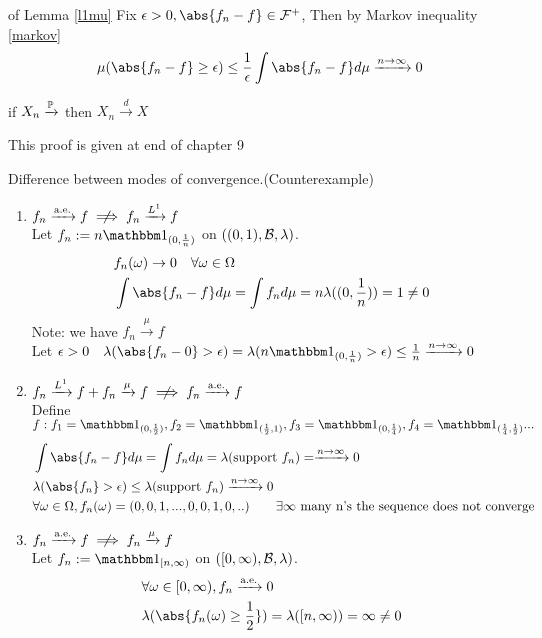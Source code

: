 \pf of Lemma \ref{l1mu} Fix $\epsilon >0, \abs{f_n - f}\in \F^+$, Then by Markov inequality \ref{markov}
\begin{equation*}
    \mu(\abs{f_n-f} \geq \epsilon) \leq \frac{1}{\epsilon}\int \abs{f_n-f} d\mu \xrightarrow{n\rightarrow \infty} 0
\end{equation*}
\begin{lem}
if $X_n \xrightarrow{\mathbb{P}}$ then $X_n \xrightarrow{d} X$
\end{lem}
This proof is given at end of chapter 9
\newpage
\begin{example}Difference between modes of convergence.(Counterexample)
\begin{enumerate}
    \item $f_n \xrightarrow{\text{a.e.}}f \notimplies f_n \xrightarrow{\ls{1}}f$ \\
    Let $f_n := n \I_{(0,\frac{1}{n})}$ on $((0,1),\mathcal{B}, \lambda)$.
    \begin{align*}
        &f_n(\omega) \rightarrow 0 \quad \forall \omega \in \Omega \\
        &\int \abs{f_n - f} d\mu = \int f_n d\mu = n\lambda((0, \frac{1}{n})) = 1 \neq 0
    \end{align*}Note: we have $f_n \xrightarrow{\mu}f$ \\
    Let $\epsilon > 0\quad \lambda(\abs{f_n-0} > \epsilon) = \lambda(n\I_{(0,\frac{1}{n})} > \epsilon) \leq \frac{1}{n} \xrightarrow{n \rightarrow \infty}  0$
    \item $f_n \xrightarrow{\ls{1}}f + f_n \xrightarrow{\mu}f \notimplies f_n \xrightarrow{\text{a.e.}}f$ \\
    Define $f: f_1 = \I_{(0,\frac{1}{2})}, f_2 = \I_{(\frac{1}{2},1)}, f_3 = \I_{(0,\frac{1}{4})}, f_4 = \I_{(\frac{1}{4},\frac{1}{2})} ...$
    \begin{align*}
        &\int \abs{f_n - f} d\mu = \int f_n d\mu = \lambda(\text{support }f_n) = \xrightarrow{n \rightarrow \infty}  0 \\
        &\lambda(\abs{f_n} > \epsilon) \leq \lambda(\text{support }f_n) \xrightarrow{n \rightarrow \infty}  0 \\
        &\forall \omega\in\Omega, f_n(\omega) = (0,0,1,...,0,0,1,0,..)\qquad \exists\infty \text{ many n's the sequence does not converge}
    \end{align*}
    \item $f_n \xrightarrow{\text{a.e.}}f \notimplies f_n \xrightarrow{\mu}f$ \\
    Let $f_n := \I_{[n,\infty)}$ on $([0,\infty),\mathcal{B}, \lambda)$.
    \begin{align*}
       & \forall \omega\in [0,\infty), f_n \xrightarrow{\text{a.e.}} 0 \\
       &\lambda(\abs{f_n(\omega) \geq \frac{1}{2}}) = \lambda([n,\infty)) =\infty \neq 0 \\
    \end{align*}
\end{enumerate}
\end{example}
